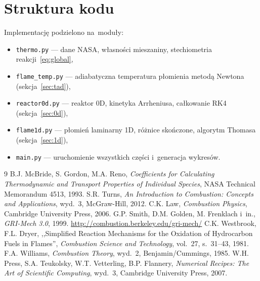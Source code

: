 \documentclass[11pt,a4paper]{article}
\begin{document}
\section{Struktura kodu}
\label{app:kod}
Implementację podzielono na~moduły:
\begin{itemize}
  \item \texttt{thermo.py} --- dane NASA, własności mieszaniny, stechiometria
        reakcji~\eqref{eq:global},
  \item \texttt{flame\_temp.py} --- adiabatyczna temperatura płomienia metodą
        Newtona (sekcja~\ref{sec:tad}),
  \item \texttt{reactor0d.py} --- reaktor 0D, kinetyka Arrheniusa, całkowanie RK4
        (sekcja~\ref{sec:0d}),
  \item \texttt{flame1d.py} --- płomień laminarny 1D, różnice skończone, algorytm
        Thomasa (sekcja~\ref{sec:1d}),
  \item \texttt{main.py} --- uruchomienie wszystkich części i~generacja wykresów.
\end{itemize}

\begin{thebibliography}{9}
 B.J. McBride, S. Gordon, M.A. Reno,
  \emph{Coefficients for Calculating Thermodynamic and Transport Properties of
  Individual Species}, NASA Technical Memorandum 4513, 1993.
 S.R. Turns, \emph{An Introduction to Combustion: Concepts and
  Applications}, wyd.~3, McGraw-Hill, 2012.
 C.K. Law, \emph{Combustion Physics}, Cambridge University Press,
  2006.
 G.P. Smith, D.M. Golden, M. Frenklach i~in.,
  \emph{GRI-Mech 3.0}, 1999. \url{http://combustion.berkeley.edu/gri-mech/}
 C.K. Westbrook, F.L. Dryer, ,,Simplified Reaction Mechanisms
  for the Oxidation of Hydrocarbon Fuels in Flames'', \emph{Combustion Science
  and Technology}, vol.~27, s.~31--43, 1981.
 F.A. Williams, \emph{Combustion Theory}, wyd.~2,
  Benjamin/Cummings, 1985.
 W.H. Press, S.A. Teukolsky, W.T. Vetterling, B.P. Flannery,
  \emph{Numerical Recipes: The Art of Scientific Computing}, wyd.~3, Cambridge
  University Press, 2007.
\end{thebibliography}
\end{document}
